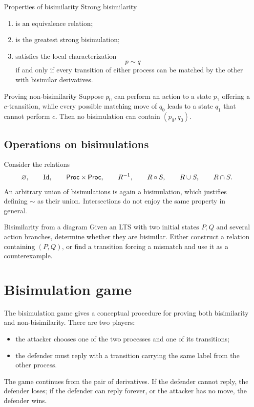 \documentclass[a4paper]{article}
\newcommand{\Proc}{\mathsf{Proc}}
\newcommand{\Id}{\operatorname{Id}}
\begin{document}
\begin{snippettheorem}{Properties of bisimilarity}
    Strong bisimilarity
    \begin{enumerate}
        \item is an equivalence relation;
        \item is the greatest strong bisimulation;
        \item satisfies the local characterization
        \[
            p\sim q
        \]
        if and only if every transition of either process can be matched by the other with bisimilar derivatives.
    \end{enumerate}
\end{snippettheorem}

\begin{snippetexample}{Proving non-bisimilarity}
    Suppose \(p_0\) can perform an action to a state \(p_1\) offering a \(c\)-transition, while every possible matching move of \(q_0\) leads to a state \(q_1\) that cannot perform \(c\).
    Then no bisimulation can contain \((p_0,q_0)\).
\end{snippetexample}

\subsection{Operations on bisimulations}

Consider the relations
\[
    \emptyset,
    \qquad
    \Id,
    \qquad
    \Proc\cartesianprod\Proc,
    \qquad
    R^{-1},
    \qquad
    R\circ S,
    \qquad
    R\union S,
    \qquad
    R\intersection S.
\]
An arbitrary union of bisimulations is again a bisimulation, which justifies defining \(\sim\) as their union.
Intersections do not enjoy the same property in general.

\begin{snippetexercise}{Bisimilarity from a diagram}
    Given an LTS with two initial states \(P,Q\) and several action branches, determine whether they are bisimilar.
    Either construct a relation containing \((P,Q)\), or find a transition forcing a mismatch and use it as a counterexample.
\end{snippetexercise}

\section{Bisimulation game}

The bisimulation game gives a conceptual procedure for proving both bisimilarity and non-bisimilarity.
There are two players:
\begin{itemize}
    \item the attacker chooses one of the two processes and one of its transitions;
    \item the defender must reply with a transition carrying the same label from the other process.
\end{itemize}
The game continues from the pair of derivatives.
If the defender cannot reply, the defender loses; if the defender can reply forever, or the attacker has no move, the defender wins.
\end{document}
